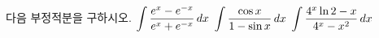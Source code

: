 다음 부정적분을 구하시오.
 $\displaystyle\int\dfrac{e^x-e^{-x}}{e^x+e^{-x}}\mkern3mu dx$
 $\displaystyle\int\dfrac{\cos x}{1-\sin x}\mkern3mu dx$
 $\displaystyle\int\dfrac{4^x\ln 2-x}{4^x-x^2}\mkern3mu dx$
